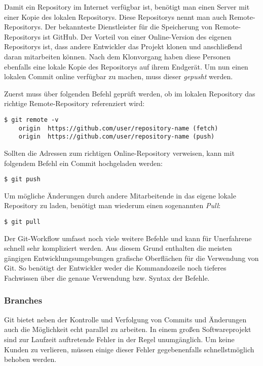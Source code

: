 Damit ein Repository im Internet verfügbar ist, benötigt man einen Server mit
einer Kopie des lokalen Repositorys. Diese Repositorys nennt man auch
Remote-Repositorys. Der bekannteste Dienstleister für die Speicherung
von Remote-Repositorys ist GitHub. Der Vorteil von einer Online-Version des
eigenen Repositorys ist, dass andere Entwickler das Projekt klonen und
anschließend daran mitarbeiten können. Nach dem Klonvorgang haben diese Personen
ebenfalls eine lokale Kopie des Repositorys auf ihrem Endgerät. Um nun einen
lokalen Commit online verfügbar zu machen, muss dieser \emph{gepusht} werden.

Zuerst muss über folgenden Befehl geprüft werden, ob im lokalen Repository das
richtige Remote-Repository referenziert wird:

\begin{lstlisting}[style=Bash]
    $ git remote -v
    origin	https://github.com/user/repository-name (fetch)
    origin	https://github.com/user/repository-name (push)
\end{lstlisting}

Sollten die Adressen zum richtigen Online-Repository verweisen, kann mit
folgendem Befehl ein Commit hochgeladen werden:

\begin{lstlisting}[style=Bash]
    $ git push
\end{lstlisting}

\newpage

Um mögliche Änderungen durch andere Mitarbeitende in das eigene lokale
Repository zu laden, benötigt man wiederum einen sogenannten \emph{Pull}:

\begin{lstlisting}[style=Bash]
    $ git pull
\end{lstlisting}

Der Git-Workflow umfasst noch viele weitere Befehle und kann für Unerfahrene
schnell sehr kompliziert werden. Aus diesem Grund enthalten die meisten gängigen
Entwicklungsumgebungen grafische Oberflächen für die Verwendung von Git. So
benötigt der Entwickler weder die Kommandozeile noch tieferes Fachwissen über
die genaue Verwendung bzw. Syntax der Befehle.

\subsubsection{Branches}
Git bietet neben der Kontrolle und Verfolgung von Commits und Änderungen auch
die Möglichkeit echt parallel zu arbeiten. In einem großen Softwareprojekt sind
zur Laufzeit auftretende Fehler in der Regel unumgänglich. Um keine Kunden zu
verlieren, müssen einige dieser Fehler gegebenenfalls schnellstmöglich behoben
werden.

